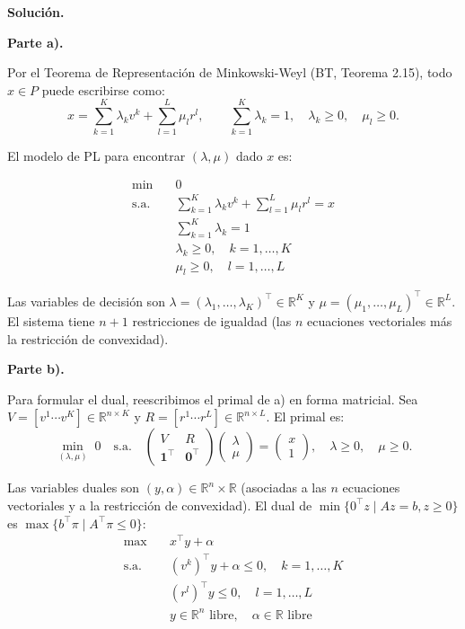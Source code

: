 \documentclass{article}
\begin{document}
\medskip
\noindent\textbf{Solución.}

\medskip
\noindent\textbf{Parte a).}

Por el Teorema de Representación de Minkowski-Weyl (BT, Teorema 2.15), todo $x \in P$ puede escribirse como:
\[
x = \sum_{k=1}^{K} \lambda_k v^k + \sum_{l=1}^{L} \mu_l r^l, \qquad \sum_{k=1}^{K} \lambda_k = 1, \quad \lambda_k \geq 0, \quad \mu_l \geq 0.
\]

El modelo de PL para encontrar $(\lambda, \mu)$ dado $x$ es:

\[
\begin{aligned}
\min\quad & 0 \\
\text{s.a.}\quad & \sum_{k=1}^{K} \lambda_k v^k + \sum_{l=1}^{L} \mu_l r^l = x \\
& \sum_{k=1}^{K} \lambda_k = 1 \\
& \lambda_k \geq 0, \quad k = 1, \ldots, K \\
& \mu_l \geq 0, \quad l = 1, \ldots, L
\end{aligned}
\]

Las variables de decisión son $\lambda = (\lambda_1, \ldots, \lambda_K)^\top \in \mathbb{R}^K$ y $\mu = (\mu_1, \ldots, \mu_L)^\top \in \mathbb{R}^L$. El sistema tiene $n + 1$ restricciones de igualdad (las $n$ ecuaciones vectoriales más la restricción de convexidad).

\medskip
\noindent\textbf{Parte b).}

Para formular el dual, reescribimos el primal de a) en forma matricial. Sea $V = [v^1 \cdots v^K] \in \mathbb{R}^{n \times K}$ y $R = [r^1 \cdots r^L] \in \mathbb{R}^{n \times L}$. El primal es:
\[
\min_{(\lambda,\mu)} \; 0 \quad \text{s.a.} \quad \begin{pmatrix} V & R \\ \mathbf{1}^\top & \mathbf{0}^\top \end{pmatrix} \begin{pmatrix} \lambda \\ \mu \end{pmatrix} = \begin{pmatrix} x \\ 1 \end{pmatrix}, \quad \lambda \geq 0, \quad \mu \geq 0.
\]

Las variables duales son $(y, \alpha) \in \mathbb{R}^n \times \mathbb{R}$ (asociadas a las $n$ ecuaciones vectoriales y a la restricción de convexidad). El dual de $\min \{0^\top z \mid Az = b, z \geq 0\}$ es $\max\{b^\top \pi \mid A^\top \pi \leq 0\}$:
\[
\begin{aligned}
\max\quad & x^\top y + \alpha \\
\text{s.a.}\quad & (v^k)^\top y + \alpha \leq 0, \quad k = 1, \ldots, K \\
& (r^l)^\top y \leq 0, \quad l = 1, \ldots, L \\
& y \in \mathbb{R}^n \text{ libre}, \quad \alpha \in \mathbb{R} \text{ libre}
\end{aligned}
\]
\end{document}
